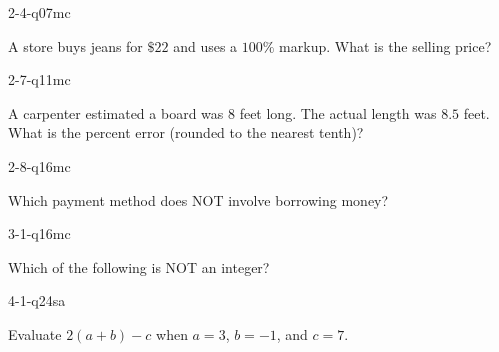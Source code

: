 \documentclass[12pt, fleqn, openany]{studyGuide}
\begin{document}
\begin{practiceQuestion}{2-4-q07}{mc}
\begin{questionText}
A store buys jeans for $\$22$ and uses a $100\%$ markup. What is the selling price?
\end{questionText}
\end{practiceQuestion}

\begin{practiceQuestion}{2-7-q11}{mc}
\begin{questionText}
A carpenter estimated a board was $8$ feet long. The actual length was $8.5$ feet. What is the percent error (rounded to the nearest tenth)?
\end{questionText}
\end{practiceQuestion}

\begin{practiceQuestion}{2-8-q16}{mc}
\begin{questionText}
Which payment method does NOT involve borrowing money?
\end{questionText}
\end{practiceQuestion}

\begin{practiceQuestion}{3-1-q16}{mc}
\begin{questionText}
Which of the following is NOT an integer?
\end{questionText}
\end{practiceQuestion}

\begin{practiceQuestion}{4-1-q24}{sa}
\begin{questionText}
Evaluate $2(a + b) - c$ when $a = 3$, $b = -1$, and $c = 7$.
\end{questionText}
\end{practiceQuestion}
\end{document}
